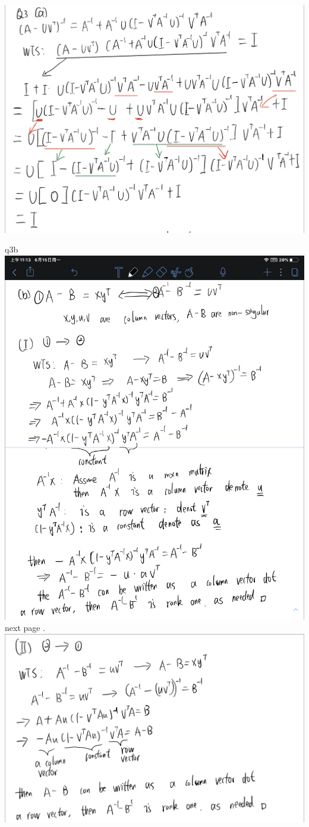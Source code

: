 \documentclass[18pt]{article}
\begin{document}
    \includegraphics[scale=0.3]{q3a.jpg}\\
\clearpage

    q3b\\
    \includegraphics[scale=0.3]{q3b1.jpg}\\
    next page . \clearpage
    \includegraphics[scale=0.3]{q3b2.jpg}
\end{document}
